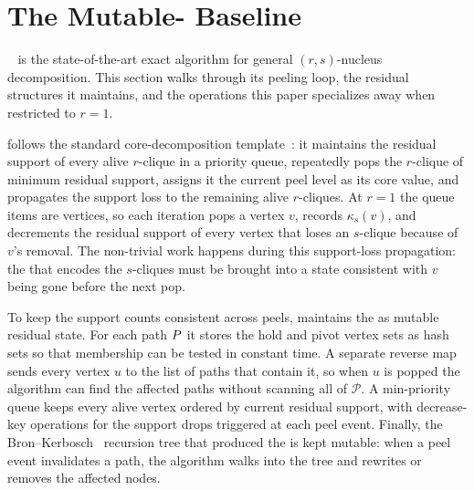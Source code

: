 \section{The Mutable-\cpi{} Baseline}\label{sec:baseline}

\cbnd{}~\cite{NuclearCD} is the state-of-the-art exact algorithm for general $(r,s)$-nucleus decomposition.
%
This section walks through its peeling loop, the residual structures it maintains, and the operations this paper specializes away when restricted to $r=1$.

\cbnd{} follows the standard core-decomposition template~\cite{coreAlg}: it maintains the residual support of every alive $r$-clique in a priority queue, repeatedly pops the $r$-clique of minimum residual support, assigns it the current peel level as its core value, and propagates the support loss to the remaining alive $r$-cliques.
%
At $r{=}1$ the queue items are vertices, so each iteration pops a vertex $v$, records $\kappa_s(v)$, and decrements the residual support of every vertex that loses an $s$-clique because of $v$'s removal.
%
The non-trivial work happens during this support-loss propagation: the \cpi{} that encodes the $s$-cliques must be brought into a state consistent with $v$ being gone before the next pop.

To keep the support counts consistent across peels, \cbnd{} maintains the \cpi{} as mutable residual state.
%
For each path $\TPath$ it stores the hold and pivot vertex sets as hash sets so that membership can be tested in constant time.
%
A separate reverse map sends every vertex $u$ to the list of paths that contain it, so when $u$ is popped the algorithm can find the affected paths without scanning all of $\mathcal{P}$.
%
A min-priority queue keeps every alive vertex ordered by current residual support, with decrease-key operations for the support drops triggered at each peel event.
%
Finally, the Bron--Kerbosch~\cite{BronKerbosch} recursion tree that produced the \cpi{} is kept mutable: when a peel event invalidates a path, the algorithm walks into the tree and rewrites or removes the affected nodes.

